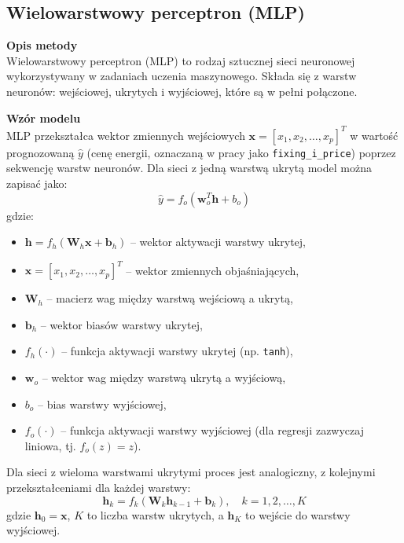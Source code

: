 \subsection{Wielowarstwowy perceptron (MLP)}

\textbf{Opis metody} \\
Wielowarstwowy perceptron (MLP) to rodzaj sztucznej sieci neuronowej wykorzystywany w zadaniach uczenia maszynowego. Składa się z warstw neuronów: wejściowej, ukrytych i wyjściowej, które są w pełni połączone.

\textbf{Wzór modelu} \\
MLP przekształca wektor zmiennych wejściowych \( \mathbf{x} = [x_1, x_2, \dots, x_p]^T \) w wartość prognozowaną \( \hat{y} \) (cenę energii, oznaczaną w pracy jako \texttt{fixing\_i\_price}) poprzez sekwencję warstw neuronów. Dla sieci z jedną warstwą ukrytą model można zapisać jako:
\begin{equation}
\hat{y} = f_o\left( \mathbf{w}_o^T \mathbf{h} + b_o \right)
\end{equation}
gdzie:
\begin{itemize}
    \item \( \mathbf{h} = f_h\left( \mathbf{W}_h \mathbf{x} + \mathbf{b}_h \right) \) -- wektor aktywacji warstwy ukrytej,
    \item \( \mathbf{x} = [x_1, x_2, \dots, x_p]^T \) -- wektor zmiennych objaśniających,
    \item \( \mathbf{W}_h \) -- macierz wag między warstwą wejściową a ukrytą,
    \item \( \mathbf{b}_h \) -- wektor biasów warstwy ukrytej,
    \item \( f_h(\cdot) \) -- funkcja aktywacji warstwy ukrytej (np. \texttt{tanh}),
    \item \( \mathbf{w}_o \) -- wektor wag między warstwą ukrytą a wyjściową,
    \item \( b_o \) -- bias warstwy wyjściowej,
    \item \( f_o(\cdot) \) -- funkcja aktywacji warstwy wyjściowej (dla regresji zazwyczaj liniowa, tj. \( f_o(z) = z \)).
\end{itemize}

Dla sieci z wieloma warstwami ukrytymi proces jest analogiczny, z kolejnymi przekształceniami dla każdej warstwy:
\begin{equation}
\mathbf{h}_k = f_k\left( \mathbf{W}_k \mathbf{h}_{k-1} + \mathbf{b}_k \right), \quad k = 1, 2, \dots, K
\end{equation}
gdzie \( \mathbf{h}_0 = \mathbf{x} \), \( K \) to liczba warstw ukrytych, a \( \mathbf{h}_K \) to wejście do warstwy wyjściowej.

